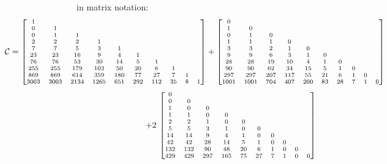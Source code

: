 in matrix notation:
\begin{displaymath}
\hspace{-3cm}
\scriptsize
\mathcal{C} = 
\left[\begin{matrix}
1 &  &  &  &  &  &  &  &  &  \\
0 & 1 &  &  &  &  &  &  &  &  \\
0 & 1 & 1 &  &  &  &  &  &  &  \\
2 & 2 & 2 & 1 &  &  &  &  &  &  \\
7 & 7 & 5 & 3 & 1 &  &  &  &  &  \\
23 & 23 & 16 & 9 & 4 & 1 &  &  &  &  \\
76 & 76 & 53 & 30 & 14 & 5 & 1 &  &  &  \\
255 & 255 & 179 & 103 & 50 & 20 & 6 & 1 &  &  \\
869 & 869 & 614 & 359 & 180 & 77 & 27 & 7 & 1 &  \\
3003 & 3003 & 2134 & 1265 & 651 & 292 & 112 & 35 & 8 & 1 \\
\end{matrix}\right] + 
\left[\begin{matrix}
0 &  &  &  &  &  &  &  &  &  \\
1 & 0 &  &  &  &  &  &  &  &  \\
0 & 1 & 0 &  &  &  &  &  &  &  \\
1 & 1 & 1 & 0 &  &  &  &  &  &  \\
3 & 3 & 2 & 1 & 0 &  &  &  &  &  \\
9 & 9 & 6 & 3 & 1 & 0 &  &  &  &  \\
28 & 28 & 19 & 10 & 4 & 1 & 0 &  &  &  \\
90 & 90 & 62 & 34 & 15 & 5 & 1 & 0 &  &  \\
297 & 297 & 207 & 117 & 55 & 21 & 6 & 1 & 0 &  \\
1001 & 1001 & 704 & 407 & 200 & 83 & 28 & 7 & 1 & 0 \\
\end{matrix}\right] 
\end{displaymath}
\begin{displaymath}
\scriptsize
+ 2\,\left[\begin{matrix}
0 &  &  &  &  &  &  &  &  &  \\
0 & 0 &  &  &  &  &  &  &  &  \\
1 & 0 & 0 &  &  &  &  &  &  &  \\
1 & 1 & 0 & 0 &  &  &  &  &  &  \\
2 & 2 & 1 & 0 & 0 &  &  &  &  &  \\
5 & 5 & 3 & 1 & 0 & 0 &  &  &  &  \\
14 & 14 & 9 & 4 & 1 & 0 & 0 &  &  &  \\
42 & 42 & 28 & 14 & 5 & 1 & 0 & 0 &  &  \\
132 & 132 & 90 & 48 & 20 & 6 & 1 & 0 & 0 &  \\
429 & 429 & 297 & 165 & 75 & 27 & 7 & 1 & 0 & 0 \\ 
\end{matrix}\right]
\end{displaymath}


